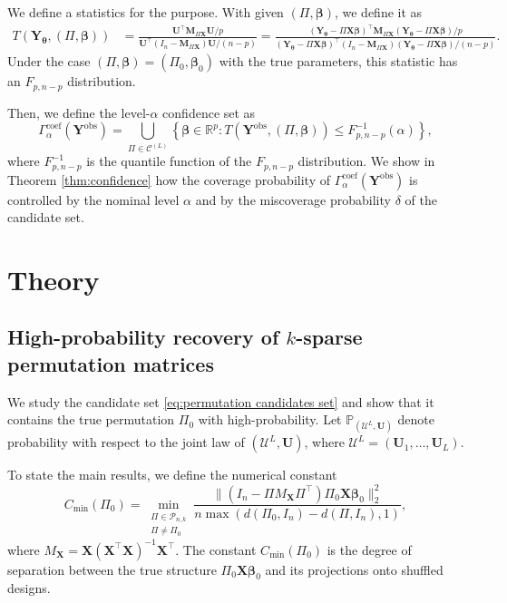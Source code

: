 \documentclass[11pt, reqno]{amsart}
\newcommand{\R}{\mathbb{R}}
\newcommand{\bP}{\mathbb{P}}
\renewcommand{\le}{\leqslant}
\newcommand{\mP}{\mathcal{P}}
\newcommand{\1}{\mbox{1}\hspace{-0.25em}\mbox{l}}
\newcommand{\obs}{\mathrm{obs}}
\theoremstyle{definition}\newtheorem{problem}{Problem}[section]
\theoremstyle{definition}\newtheorem{definition}[problem]{Definition}
\theoremstyle{remark}\newtheorem{assumption}{Assumption}
\theoremstyle{remark}\newtheorem{remark}[problem]{Remark}
\theoremstyle{definition}\newtheorem{example}[problem]{Example}
\theoremstyle{plain}\newtheorem{theorem}[problem]{Theorem}
\theoremstyle{plain}\newtheorem{question}[problem]{Question}
\theoremstyle{plain}\newtheorem{lemma}[problem]{Lemma}
\theoremstyle{plain}\newtheorem{proposition}[problem]{Proposition}
\theoremstyle{plain}\newtheorem{corollary}[problem]{Corollary}
\theoremstyle{plain}\newtheorem{conjecture}[problem]{Conjecture}
\begin{document}
We define a statistics for the purpose. With given $(\Pi, \bm{\beta})$, we define it as
\begin{align*}
    T(\bm Y_{\bm \theta}, (\Pi, \bm{\beta}))  
    &= \frac{\bm{U}^\top \bm{M}_{\Pi \bm{X}}\bm{U}/p}{\bm{U}^\top (I_n - \bm{M}_{\Pi \bm{X}}) \bm{U}/(n-p)} 
     = \frac{(\bm Y_{\bm \theta} - \Pi \bm{X} \bm{\beta})^\top \bm{M}_{\Pi \bm{X}} (\bm Y_{\bm \theta} - \Pi \bm{X} \bm{\beta} )/p}{(\bm Y_{\bm \theta} - \Pi \bm{X} \bm{\beta} )^\top (I_n - \bm{M}_{\Pi \bm{X}})(\bm Y_{\bm \theta} - \Pi \bm{X} \bm{\beta} )/(n-p)}.
\end{align*}
Under the case $(\Pi, \bm{\beta}) = (\Pi_0, \bm{\beta}_0)$ with the true parameters, this statistic has an $F_{p, n-p}$ distribution.

Then, we define the level-$\alpha$ confidence set as
\begin{equation}\label{eq:confidence set beta zero}
    \Gamma_{\alpha}^{\mathrm{coef}}(\bm{Y}^{\obs}) = \bigcup_{\Pi \in \mathcal{C}^{(L)}} \left\{\bm{\beta}\in \R^p : T(\bm{Y}^{\obs}, (\Pi, \bm{\beta})) \le F_{p, n-p}^{-1}(\alpha) \right\},
\end{equation}
where $F_{p, n-p}^{-1}$ is the quantile function of the $F_{p, n-p}$ distribution. We show in Theorem \ref{thm:confidence} how the coverage probability of $\Gamma_{\alpha}^{\mathrm{coef}}(\bm{Y}^{\obs})$ is controlled by the nominal level $\alpha$ and by the miscoverage probability $\delta$ of the candidate set.

\section{Theory}\label{sec:theory}


\subsection{High-probability recovery of $k$-sparse permutation matrices}

We study the candidate set \eqref{eq:permutation candidates set} and show that it contains the true permutation $\Pi_0$ with high-probability.
Let $\bP_{\left(\mathcal{U}^L, \bm{U}\right)}$ denote probability with respect to the joint law of $(\mathcal{U}^L, \bm{U})$, where $\mathcal{U}^L = (\bm{U}_1,\dots, \bm{U}_L)$. 

To state the main results, we define the numerical constant
\begin{equation}\label{eq:c min}
     C_{\min}(\Pi_0) = \min_{\substack{\Pi \in \mP_{n,k}\\ \Pi \neq \Pi_0}} \frac{\|(I_n - \Pi M_{\bm{X}} \Pi^\top) \Pi_0\bm{X}\bm{\beta}_{0} \|_2^2}{n \max (d(\Pi_0, I_n) - d(\Pi, I_n), 1)},
\end{equation}
where $M_{\bm{X}} = \bm{X} (\bm{X}^\top \bm{X})^{-1}\bm{X}^\top$. %
The constant $C_{\min}(\Pi_0)$ is the degree of separation between the true structure $\Pi_0\bm{X}\bm{\beta}_{0}$ and its projections onto shuffled designs.
\end{document}
